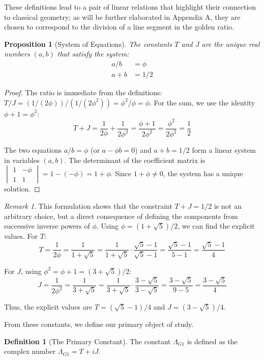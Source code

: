 \documentclass{amsart}
\theoremstyle{plain}
\newtheorem{proposition}[theorem]{Proposition}
\theoremstyle{definition}
\newtheorem{definition}[theorem]{Definition}
\theoremstyle{remark}
\newtheorem*{remark}{Remark}
\newcommand{\LambdaG}{\Lambda_{G1}}
\newcommand{\phiG}{\phi}
\begin{document}
These definitions lead to a pair of linear relations that highlight their connection to classical geometry; as will be further elaborated in Appendix A, they are chosen to correspond to the division of a line segment in the golden ratio.
\begin{proposition}[System of Equations]
The constants $T$ and $J$ are the unique real numbers $(a,b)$ that satisfy the system:
\begin{align}
    a/b &= \phiG \label{eq:1} \\
    a+b &= 1/2 \label{eq:2}
\end{align}
\end{proposition}
\begin{proof}
The ratio is immediate from the definitions: $T/J = (1/(2\phiG))/(1/(2\phiG^2)) = \phiG^2/\phiG = \phiG$. For the sum, we use the identity $\phiG+1 = \phiG^2$:
\[ T+J = \frac{1}{2\phiG} + \frac{1}{2\phiG^2} = \frac{\phiG+1}{2\phiG^2} = \frac{\phiG^2}{2\phiG^2} = \frac{1}{2} \]

The two equations $a/b = \phiG$ (or $a - \phiG b = 0$) and $a+b=1/2$ form a linear system in variables $(a,b)$. The determinant of the coefficient matrix is $\begin{vmatrix} 1 & -\phiG \\ 1 & 1 \end{vmatrix} = 1 - (-\phiG) = 1+\phiG$. Since $1+\phiG \neq 0$, the system has a unique solution.
\end{proof}

\begin{remark}
This formulation shows that the constraint $T+J=1/2$ is not an arbitrary choice, but a direct consequence of defining the components from successive inverse powers of $\phiG$. Using $\phiG = (1+\sqrt{5})/2$, we can find the explicit values. For $T$:
\[ T = \frac{1}{2\phiG} = \frac{1}{1+\sqrt{5}} = \frac{1}{1+\sqrt{5}} \cdot \frac{\sqrt{5}-1}{\sqrt{5}-1} = \frac{\sqrt{5}-1}{5-1} = \frac{\sqrt{5}-1}{4} \]

For $J$, using $\phiG^2 = \phiG+1 = (3+\sqrt{5})/2$:
\[ J = \frac{1}{2\phiG^2} = \frac{1}{3+\sqrt{5}} = \frac{1}{3+\sqrt{5}} \cdot \frac{3-\sqrt{5}}{3-\sqrt{5}} = \frac{3-\sqrt{5}}{9-5} = \frac{3-\sqrt{5}}{4} \]

Thus, the explicit values are $T = (\sqrt{5}-1)/4$ and $J = (3-\sqrt{5})/4$.
\end{remark}

From these constants, we define our primary object of study.
\begin{definition}[The Primary Constant]
The constant $\LambdaG$ is defined as the complex number $\LambdaG = T+iJ$.
\end{definition}
\end{document}
